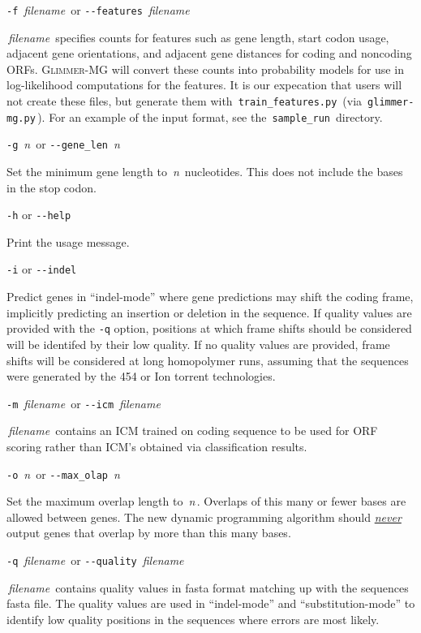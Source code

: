 \documentclass[fleqn,titlepage,11pt]{article}
\def\Desc#1{\,\mbox{\emph{#1}}\,}
\def\Gmg{\textsc{Glimmer-MG}}
\def\Pg#1{\texttt{#1}}
\begin{document}
\exdent
  \verb`-f` \Desc{filename} \enskip or \enskip \verb`--features` \Desc{filename}

  \Desc{filename} specifies counts for features such as gene length,
  start codon usage, adjacent gene orientations, and adjacent gene
  distances for coding and noncoding ORFs. \Gmg{} will convert these
  counts into probability models for use in log-likelihood
  computations for the features. It is our expecation that users will
  not create these files, but generate them with
  \,\Pg{train\_features.py}\, (via \,\Pg{glimmer-mg.py}\,). For an
  example of the input format, see the \,\Pg{sample\_run}\, directory.

\exdent
  \verb`-g` \Desc{n} \enskip or \enskip \verb`--gene_len` \Desc{n}

  Set the minimum gene length to \Desc{n} nucleotides.  This does not include
  the bases in the stop codon.

\exdent
  \verb`-h` \enskip or \enskip \verb`--help`

  Print the usage message.

\exdent
  \verb`-i` \enskip or \enskip \verb`--indel`

  Predict genes in ``indel-mode'' where gene predictions may shift the
  coding frame, implicitly predicting an insertion or deletion in the
  sequence. If quality values are provided with the \verb`-q` option,
  positions at which frame shifts should be considered will be
  identifed by their low quality. If no quality values are provided,
  frame shifts will be considered at long homopolymer runs, assuming
  that the sequences were generated by the 454 or Ion torrent
  technologies.

\exdent
  \verb`-m` \Desc{filename} \enskip or \enskip \verb`--icm` \Desc{filename}

  \Desc{filename} contains an ICM trained on coding sequence to be used
  for ORF scoring rather than ICM's obtained via classification results.

\exdent
  \verb`-o` \Desc{n} \enskip or \enskip \verb`--max_olap` \Desc{n}

  Set the maximum overlap length to \Desc{n}.  Overlaps of this
  many or fewer bases are allowed between genes.  The new
  dynamic programming algorithm should \underline{\emph{never}}
  output genes that overlap by more than this many bases.

\exdent
  \verb`-q` \Desc{filename} \enskip or \enskip \verb`--quality` \Desc{filename}

  \Desc{filename} contains quality values in fasta format matching up
  with the sequences fasta file. The quality values are used in
  ``indel-mode'' and ``substitution-mode'' to identify low quality
  positions in the sequences where errors are most likely.
\end{document}
